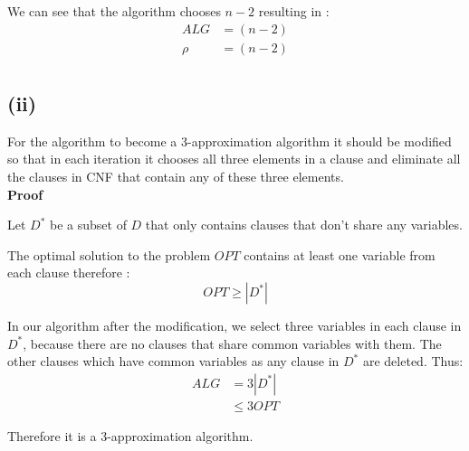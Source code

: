 We can see that the algorithm chooses $ n-2 $ resulting in :
\begin{align*}
	ALG &= (n-2)\\
	\rho &= (n-2) \\
\end{align*}

\subsection*{(ii)}
For the algorithm to become a 3-approximation algorithm it should be modified so that in each iteration it chooses all three elements in a clause and eliminate all the clauses in CNF that contain any of these three elements.\\

\textbf{Proof}

Let $ D^* $ be a subset of $ D $ that only contains clauses that don't share any variables.

The optimal solution to the problem $ OPT $ contains at least one variable from each clause therefore :
$$ OPT \ge |D^*|$$ 

In our algorithm after the modification, we select three variables in each clause in $ D^* $,
because there are no clauses that share common variables with them.
The other clauses which have common variables as any clause in $ D^* $ are deleted.
Thus:
\begin{align*}
	ALG &= 3 |D^*| \\
	&\leq 3 OPT
\end{align*}

Therefore it is a 3-approximation algorithm.
